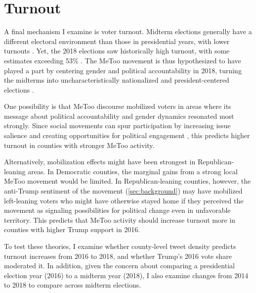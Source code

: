\documentclass[manuscript,screen,nonacm,11pt,acm]{acmart}
\begin{document}
\section{Turnout}
\label{sec:turnout}
A final mechanism I examine is voter turnout.
Midterm elections generally have a different electoral environment than those in presidential years, with lower turnouts \citep{Lucas2021}.
Yet, the 2018 elections saw historically high turnout, with some estimates exceeding 53\% \citep{brookings2019turnout}.
The MeToo movement is thus hypothesized to have played a part by centering gender and political accountability in 2018, turning the midterms into uncharacteristically nationalized and president-centered elections \citep[\cref{sec:background};][]{Lucas2021, womenmarch, CarsonHitefield2018, Safarpour2022, genderwatch2018, telegraphMetoo, tippett2018-bi, thomsen2020}.

One possibility is that MeToo discourse mobilized voters in areas where its message about political accountability and gender dynamics resonated most strongly.
Since social movements can spur participation by increasing issue salience and creating opportunities for political engagement \citep{McAdam_Tarrow_2010}, this predicts higher turnout in counties with stronger MeToo activity. 

Alternatively, mobilization effects might have been strongest in Republican-leaning areas.
In Democratic counties, the marginal gains from a strong local MeToo movement would be limited.
In Republican-leaning counties, however, the anti-Trump sentiment of the movement (\cref{sec:background}) may have mobilized left-leaning voters who might have otherwise stayed home if they perceived the movement as signaling possibilities for political change even in unfavorable territory.
This predicts that MeToo activity should increase turnout more in counties with higher Trump support in 2016.

To test these theories, I examine whether county-level tweet density predicts turnout increases from 2016 to 2018, and whether Trump's 2016 vote share moderated it.
In addition, given the concern about comparing a presidential election year (2016) to a midterm year (2018), I also examine changes from 2014 to 2018 to compare across midterm elections.
\end{document}
